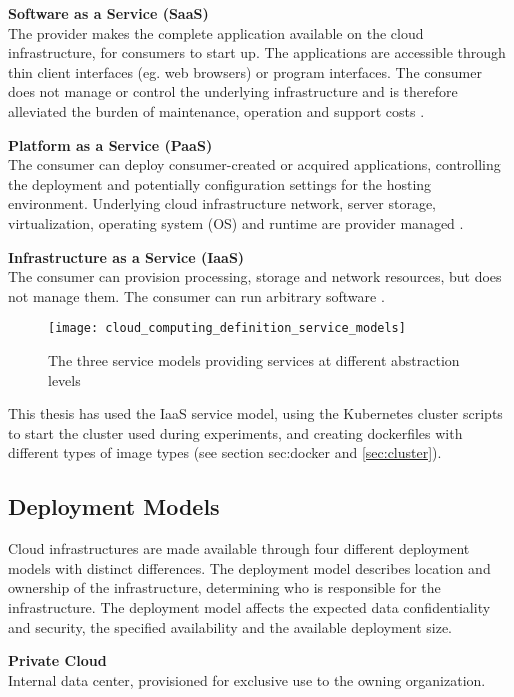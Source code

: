 \textbf{Software as a Service (SaaS)}\\
The provider makes the complete application available on the cloud infrastructure, for consumers to start up. The applications are accessible through thin client interfaces (eg. web browsers) or program interfaces. The consumer does not manage or control the underlying infrastructure and is therefore alleviated the burden of maintenance, operation and support costs \cite{youseff2008toward}.


\textbf{Platform as a Service (PaaS)}\\
The consumer can deploy consumer-created or acquired applications, controlling the deployment and potentially configuration settings for the hosting environment. Underlying cloud infrastructure network, server storage, virtualization, operating system (OS) and runtime are provider managed \cite{youseff2008toward}.

\textbf{Infrastructure as a Service (IaaS)}\\
The consumer can provision processing, storage and network resources, but does not manage them. The consumer can run arbitrary software \cite{youseff2008toward}.

\begin{figure}[!htb]
  \texttt{[image: cloud\_computing\_definition\_service\_models]}  
  \caption{The three service models providing services at different abstraction levels}
  \label{fig:cloud_computing_definition_service_models}
\end{figure}

This thesis has used the IaaS service model, using the Kubernetes cluster scripts to start the cluster used during experiments, and creating dockerfiles with different types of image types (see section {sec:docker} and \ref{sec:cluster}).

\subsection{Deployment Models}
Cloud infrastructures are made available through four different deployment models with distinct differences. The deployment model describes location and ownership of the infrastructure, determining who is responsible for the infrastructure. The deployment model affects the expected data confidentiality and security, the specified availability and the available deployment size.

\textbf{Private Cloud}\\
Internal data center, provisioned for exclusive use to the owning organization.

